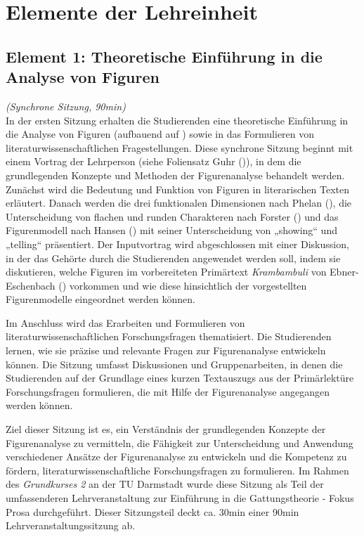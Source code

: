 \documentclass[
          a4paper,
        ]{article}
\begin{document}
\section{Elemente der Lehreinheit}\label{elemente-der-lehreinheit}

\subsection{Element 1: Theoretische Einführung in die Analyse von
Figuren}\label{element-1-theoretische-einfuxfchrung-in-die-analyse-von-figuren}

\emph{(Synchrone Sitzung, 90min)}\\
In der ersten Sitzung erhalten die Studierenden eine theoretische
Einführung in die Analyse von Figuren (aufbauend auf
) sowie in das
Formulieren von literaturwissenschaftlichen Fragestellungen. Diese
synchrone Sitzung beginnt mit einem Vortrag der Lehrperson (siehe
Foliensatz Guhr ()), in dem die
grundlegenden Konzepte und Methoden der Figurenanalyse behandelt werden.
Zunächst wird die Bedeutung und Funktion von Figuren in literarischen
Texten erläutert. Danach werden die drei funktionalen Dimensionen nach
Phelan (), die Unterscheidung von
flachen und runden Charakteren nach Forster
() und das Figurenmodell nach Hansen
() mit seiner Unterscheidung von
„showing`` und „telling`` präsentiert. Der Inputvortrag wird
abgeschlossen mit einer Diskussion, in der das Gehörte durch die
Studierenden angewendet werden soll, indem sie diskutieren, welche
Figuren im vorbereiteten Primärtext \emph{Krambambuli} von
Ebner-Eschenbach ()
vorkommen und wie diese hinsichtlich der vorgestellten Figurenmodelle
eingeordnet werden können.

Im Anschluss wird das Erarbeiten und Formulieren von
literaturwissenschaftlichen Forschungsfragen thematisiert. Die
Studierenden lernen, wie sie präzise und relevante Fragen zur
Figurenanalyse entwickeln können. Die Sitzung umfasst Diskussionen und
Gruppenarbeiten, in denen die Studierenden auf der Grundlage eines
kurzen Textauszugs aus der Primärlektüre Forschungsfragen formulieren,
die mit Hilfe der Figurenanalyse angegangen werden können.

Ziel dieser Sitzung ist es, ein Verständnis der grundlegenden Konzepte
der Figurenanalyse zu vermitteln, die Fähigkeit zur Unterscheidung und
Anwendung verschiedener Ansätze der Figurenanalyse zu entwickeln und die
Kompetenz zu fördern, literaturwissenschaftliche Forschungsfragen zu
formulieren. Im Rahmen des \emph{Grundkurses 2} an der TU Darmstadt
wurde diese Sitzung als Teil der umfassenderen Lehrveranstaltung zur
Einführung in die Gattungstheorie - Fokus Prosa durchgeführt. Dieser
Sitzungsteil deckt ca. 30min einer 90min Lehrveranstaltungssitzung ab.
\end{document}
